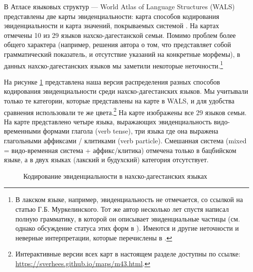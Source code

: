 В Атласе языковых структур --- World Atlas of Language Structures (WALS) \citep{wals} представлены две карты эвиденциальности: карта способов кодирования эвиденциальности \citep{walsevform} и карта значений, покрываемых системой \citep{walsevsem}. На картах отмечены 10 из 29 языков нахско-дагестанской семьи. Помимо проблем более общего характера (например, решения автора о том, что представляет собой грамматический показатель, и отсутствие указаний на конкретные морфемы), в данных нахско-дагестанских языков мы заметили некоторые неточности.\footnote{В лакском языке, например, эвиденциальность не отмечается, со ссылкой на статью Г.Б. Муркелинского. Тот же автор несколько лет спустя написал полную грамматику, в которой он описывает эвиденциальные частицы \citep{murkelinsky} (см. однако обсуждение статуса этих форм в \citep{friedman2007}). Имеются и другие неточности и неверные интерпретации, которые перечислены в \citep{verheesmaps}.}
\par На рисунке \ref{fig:walscorrmap} представлена наша версия распределения разных способов кодирования эвиденциальности среди нахско-дагестанских языков. Мы учитывали только те категории, которые представлены на карте в WALS, и для удобства сравнения использовали те же цвета.\footnote{Интерактивные версии всех карт в настоящем разделе доступны по ссылке: \url{https://sverhees.github.io/maps/m43.html}.} На карте изображены все 29 языков семьи. На карте \citep{walsevform} представлено четыре языка, выражающих эвиденциальность видо-временными формами глагола (verb tense), три языка где она выражена глагольными аффиксами / клитиками (verb particle). Смешанная система (mixed = видо-временная система + аффикс/клитика) отмечена только в бацбийском языке, а в двух языках (лакский и будухский) категория отсутствует.

\begin{figure}[H]
\centering
\caption{Кодирование эвиденциальности в нахско-дагестанских языках}
\label{fig:walscorrmap}
\vspace{0.5cm}
\end{figure}


